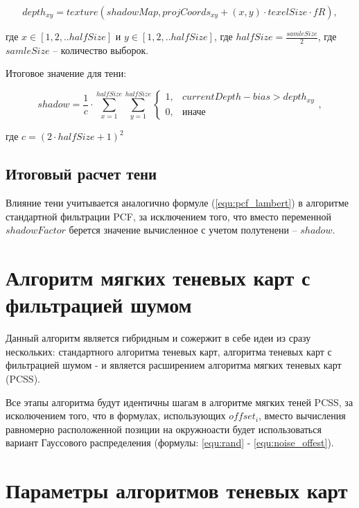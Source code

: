 \begin{equation}
    \label{equ:depth_pcss}
    depth_{xy} = texture(shadowMap, projCoords_{xy} + (x,y) \cdot texelSize \cdot fR),
\end{equation}

\noindent где $x \in [1, 2, .. halfSize]$ и $y \in [1, 2, .. halfSize]$, где $halfSize = \frac{samleSize}{2}$,
где $samleSize$ -- количество выборок.

Итоговое значение для тени:

\begin{equation}
    \label{equ:pcf_pcss}
    shadow = \frac{1}{c} \cdot \sum_{x = 1}^{halfSize}\sum_{y = 1}^{halfSize}
    \begin{cases}
        1, & \text{$currentDepth - bias > depth_{xy}$} \\
        0, & \text{иначе}
    \end{cases},
\end{equation}

\noindent где $c = (2 \cdot halfSize + 1)^{2}$

\subsection*{Итоговый расчет тени}

Влияние тени учитывается аналогично формуле (\ref{equ:pcf_lambert}) в алгоритме
стандартной фильтрации PCF, за исключением того, что вместо переменной $shadowFactor$
берется значение вычисленное с учетом полутенени -- $shadow$.

\section{Алгоритм мягких теневых карт с фильтрацией шумом}

Данный алгоритм является гибридным и сожержит в себе идеи из
сразу нескольких: стандартного алгоритма теневых карт,
алгоритма теневых карт с фильтрацией шумом - и является
расширением алгоритма мягких теневых карт (PCSS).

Все этапы алгоритма будут идентичны шагам в алгоритме мягких
теней PCSS, за исколючением того, что в формулах, использующих
$offset_i$, вместо вычисления равномерно расположенной позиции на окружноасти
будет использоваться вариант Гауссового распределения (формулы: \ref{equ:rand} - \ref{equ:noise_offest}).

\section{Параметры алгоритмов теневых карт}

